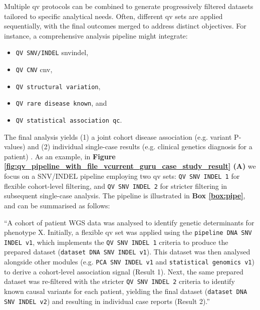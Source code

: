 Multiple \ac{qv} protocols can be combined to generate progressively filtered datasets tailored to specific analytical needs. Often, different \ac{qv} sets are applied sequentially, with the final outcomes merged to address distinct objectives. For instance, a comprehensive analysis pipeline might integrate:
\begin{itemize}
  \item \colorbox{kispiblue!05}{\texttt{QV SNV/INDEL}}  \ac{snvindel},
  \item \colorbox{kispiblue!05}{\texttt{QV CNV}} \ac{cnv},
  \item \colorbox{kispiblue!05}{\texttt{QV structural variation}},
  \item \colorbox{kispiblue!05}{\texttt{QV rare disease known}}, and 
  \item \colorbox{kispiblue!05}{\texttt{QV statistical association \ac{qc}}}.
\end{itemize}
The final analysis yields (1) a joint cohort disease association (e.g. variant P-values) and (2) individual single-case results (e.g. clinical genetics diagnosis for a patient)
\cite{auwera_genomics_2020, li2025statistical}.
As an example, in 
\textbf{Figure \ref{fig:qv_pipeline_with_file_vcurrent_guru_case_study_result} (A)}
we focus on a SNV/INDEL pipeline employing two \ac{qv} sets:
\colorbox{colorSUNSET2!20}{\texttt{QV SNV INDEL 1}} for flexible cohort-level filtering, and 
\colorbox{colorSUNSET2!20}{\texttt{QV SNV INDEL 2}} for stricter filtering in subsequent single-case analysis. The pipeline is illustrated in \textbf{Box \ref{box:pipe}}, and can be summarised as follows:

``A cohort of patient WGS data was analysed to identify genetic determinants for phenotype X. Initially, a flexible \ac{qv} set was applied using the 
\colorbox{colorSUNSET1!10}{\texttt{pipeline DNA SNV INDEL v1}}, which implements the \colorbox{colorSUNSET2!20}{\texttt{QV SNV INDEL 1}} criteria to produce the prepared dataset (\colorbox{colorSUNSET3!10}{\texttt{dataset DNA SNV INDEL v1}}). This dataset was then analysed alongside other modules (e.g. \colorbox{colorSUNSET4!10}{\texttt{PCA SNV INDEL v1}} and \colorbox{colorSUNSET5!10}{\texttt{statistical genomics v1}}) to derive a cohort-level association signal (Result 1). Next, the same prepared dataset was re-filtered with the stricter \colorbox{colorSUNSET2!20}{\texttt{QV SNV INDEL 2}} criteria to identify known causal variants for each patient, yielding the final dataset (\colorbox{colorSUNSET3!10}{\texttt{dataset DNA SNV INDEL v2}}) and resulting in individual case reports (Result 2).''

